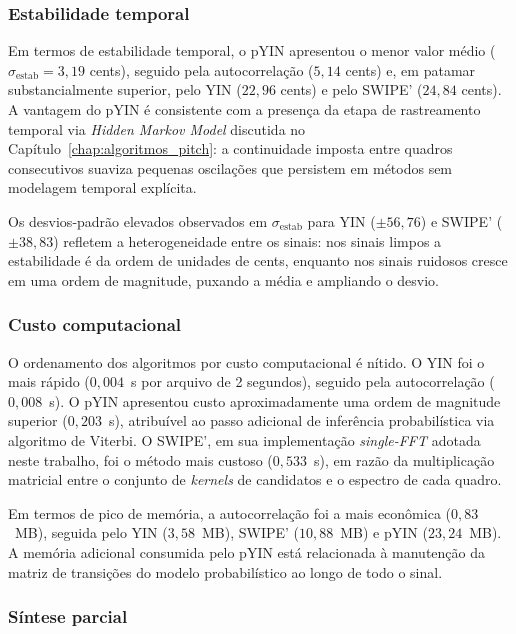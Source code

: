   \subsubsection{Estabilidade temporal}

  Em termos de estabilidade temporal, o pYIN apresentou o menor valor médio
  ($\sigma_{\text{estab}} = 3{,}19$ cents), seguido pela autocorrelação
  ($5{,}14$ cents) e, em patamar substancialmente superior, pelo YIN
  ($22{,}96$ cents) e pelo SWIPE' ($24{,}84$ cents). A vantagem do pYIN é
  consistente com a presença da etapa de rastreamento temporal via
  \textit{Hidden Markov Model} discutida no Capítulo~\ref{chap:algoritmos_pitch}: a continuidade imposta
  entre quadros consecutivos suaviza pequenas oscilações que persistem em
  métodos sem modelagem temporal explícita.

  Os desvios-padrão elevados observados em $\sigma_{\text{estab}}$ para YIN
  ($\pm 56{,}76$) e SWIPE' ($\pm 38{,}83$) refletem a heterogeneidade entre os
  sinais: nos sinais limpos a estabilidade é da ordem de unidades de cents,
  enquanto nos sinais ruidosos cresce em uma ordem de magnitude, puxando a
  média e ampliando o desvio.

  \subsubsection{Custo computacional}

  O ordenamento dos algoritmos por custo computacional é nítido. O YIN foi o
  mais rápido ($0{,}004$~s por arquivo de 2 segundos), seguido pela
  autocorrelação ($0{,}008$~s). O pYIN apresentou custo aproximadamente uma
  ordem de magnitude superior ($0{,}203$~s), atribuível ao passo adicional de
  inferência probabilística via algoritmo de Viterbi. O SWIPE', em sua
  implementação \textit{single-FFT} adotada neste trabalho, foi o método mais
  custoso ($0{,}533$~s), em razão da multiplicação matricial entre o conjunto
  de \textit{kernels} de candidatos e o espectro de cada quadro.

  Em termos de pico de memória, a autocorrelação foi a mais econômica
  ($0{,}83$~MB), seguida pelo YIN ($3{,}58$~MB), SWIPE' ($10{,}88$~MB) e
  pYIN ($23{,}24$~MB). A memória adicional consumida pelo pYIN está
  relacionada à manutenção da matriz de transições do modelo probabilístico
  ao longo de todo o sinal.

  \subsubsection{Síntese parcial}

